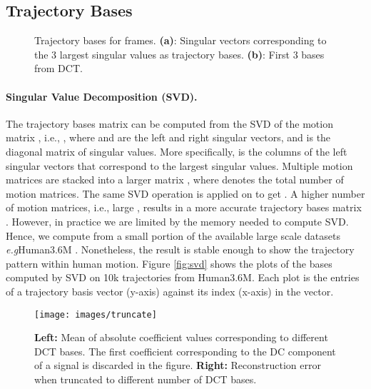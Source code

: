 \documentclass{bmvc2k}
\def\eg{\emph{e.g}\bmvaOneDot}
\begin{document}
\subsection{Trajectory Bases}
\label{sec:trajectory-bases}

\begin{figure*}[t]
\centering
{}
\quad
{}
\caption{Trajectory bases for  frames. \textbf{(a)}: Singular vectors corresponding to the 3 largest singular values as trajectory bases. \textbf{(b)}: First 3 bases from DCT.}
\label{fig:bases}
\end{figure*}

\paragraph{Singular Value Decomposition (SVD).} The trajectory bases matrix  can be computed from the SVD of the motion matrix , i.e., ,
where  and  are the left and right singular vectors, and  is the diagonal matrix of singular values. 
More specifically,  is the  columns of the left singular vectors  that correspond to the  largest singular values.   
Multiple motion matrices are stacked into a larger matrix 
, where  denotes the total number of motion matrices. The same SVD operation is applied on  to get . A higher number of motion matrices, i.e., large , results in a more accurate trajectory bases matrix . However, in practice
we are limited by the memory needed to compute SVD. Hence, we
compute  from a small portion of the available large scale datasets \eg Human3.6M \cite{ionescu2014human3}. Nonetheless, the result is stable enough to show the trajectory pattern within human motion. 
Figure \ref{fig:svd} shows the plots of the bases computed by SVD on 10k trajectories from Human3.6M. 
Each plot is the  entries of a trajectory basis vector  (y-axis) against its index (x-axis) in the vector.  

\begin{figure*}[t]
\texttt{[image: images/truncate]}
\caption{\textbf{Left:} Mean of absolute coefficient values corresponding to different DCT bases. The first coefficient corresponding to the DC component of a signal is discarded in the figure. \textbf{Right:} Reconstruction error when truncated to different number of DCT bases.}
\label{fig:truncate}
\end{figure*}
\end{document}
